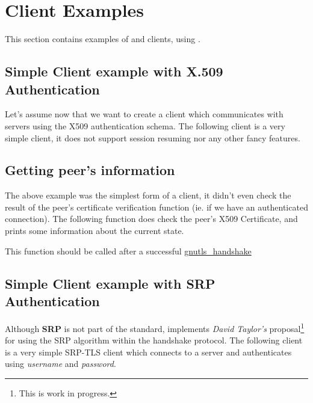 \documentclass{book}
\begin{document}














\section{Client Examples}
This section contains examples of \tls{} and \ssl{} clients, using \gnutls{}. 

\subsection{Simple Client example with X.509 Authentication}
Let's assume now that we want to create a client which communicates
with servers using the X509 authentication schema. The following client
is a very simple \tls{} client, it does not support session resuming nor
any other fancy features.


\subsection{Getting peer's information}
\par The above example was the simplest form of a client, it didn't even check
the result of the peer's certificate verification function (ie. if we have
an authenticated connection). The following function does check the peer's X509
Certificate, and prints some information about the current state.
\par
This function should be called after a successful
\hyperref{gnutls\_handshake()}{gnutls\_handshake() (see Section }{)}{gnutls_handshake}





\subsection{Simple Client example with SRP Authentication}
Although {\bf SRP} is not part of the \tls{} standard, \gnutls{} implements
{\it David Taylor's} proposal\footnote{This is work in progress.}  for using the SRP algorithm
within the \tls{} handshake protocol. The following client
is a very simple SRP-TLS client which connects to a server 
and authenticates using {\it username} and {\it password}.
\end{document}

